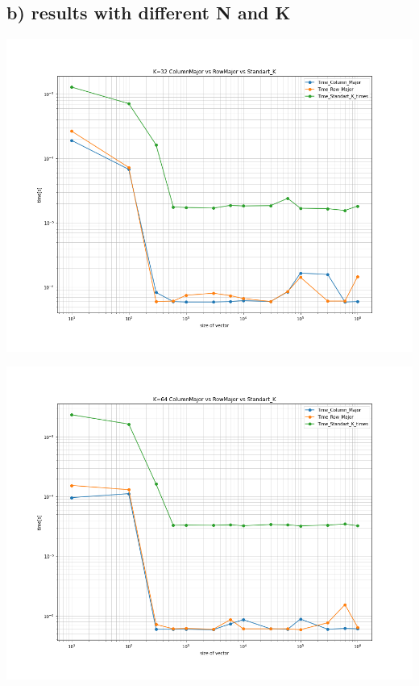 \documentclass[11pt,a4paper]{article}
\begin{document}
\subsection*{b) results with different N and K}
\begin{center}
	
	\begin{minipage}[t]{0.49\textwidth}
		\includegraphics[width=\textwidth]{Bilder/K=32_ColumnMajor_vs_RowMajor_vs_Standart_K.png}
	\end{minipage}
	\begin{minipage}[t]{0.49\textwidth}
		\includegraphics[width=\textwidth]{Bilder/K=64_ColumnMajor_vs_RowMajor_vs_Standart_K.png}
	\end{minipage}
	
\end{center}
\end{document}
